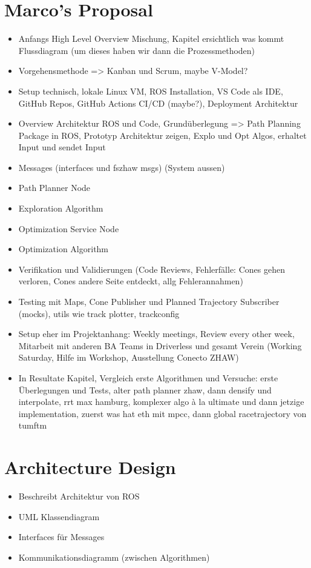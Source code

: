 \section{Marco's Proposal}
\begin{itemize}
    \item Anfangs High Level Overview Mischung, Kapitel ersichtlich was kommt Flussdiagram (um dieses haben wir dann die Prozessmethoden)
    \item Vorgehensmethode => Kanban und Scrum, maybe V-Model?
    \item Setup technisch, lokale Linux VM, ROS Installation, VS Code als IDE, GitHub Repos, GitHub Actions CI/CD (maybe?), Deployment Architektur
    \item Overview Architektur ROS und Code, Grundüberlegung => Path Planning Package in ROS, Prototyp Architektur zeigen, Explo und Opt Algos, erhaltet Input und sendet Input
    \item Messages (interfaces und fszhaw msgs) (System aussen)
    \item Path Planner Node
    \item Exploration Algorithm
    \item Optimization Service Node
    \item Optimization Algorithm
    \item Verifikation und Validierungen (Code Reviews, Fehlerfälle: Cones gehen verloren, Cones andere Seite entdeckt, allg Fehlerannahmen)
    \item Testing mit Maps, Cone Publisher und Planned Trajectory Subscriber (mocks), utils wie track plotter, trackconfig
    \item Setup eher im Projektanhang: Weekly meetings, Review every other week, Mitarbeit mit anderen BA Teams in Driverless und gesamt Verein (Working Saturday, Hilfe im Workshop, Ausstellung Conecto ZHAW)
    \item In Resultate Kapitel, Vergleich erste Algorithmen und Versuche: erste Überlegungen und Tests, alter path planner zhaw, dann densify und interpolate, rrt max hamburg, komplexer algo à la ultimate und dann jetzige implementation, zuerst was hat eth mit mpcc, dann global racetrajectory von tumftm
\end{itemize}

\section{Architecture Design} \label{sec:Architecture Design}
\begin{itemize}
    \item Beschreibt Architektur von ROS
    \item UML Klassendiagram
    \item Interfaces für Messages
    \item Kommunikationsdiagramm (zwischen Algorithmen)
\end{itemize}

